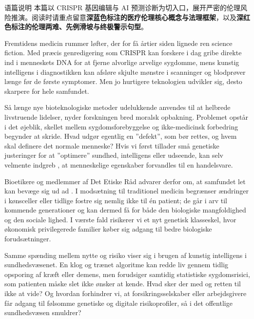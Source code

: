 \begin{tipbox}{语篇说明}
本篇以 CRISPR 基因编辑与 AI 预测诊断为切入口，展开严密的伦理风险推演。阅读时请重点留意\textbf{\color{NCDNavy}深蓝色标注的医疗伦理核心概念与法理框架}，以及\textbf{\color{NCDRed}深红色标注的伦理两难、先例滑坡与终极警示句型}。
\end{tipbox}

Fremtidens medicin rummer løfter, der for få årtier siden lignede ren science fiction. Med præcis genredigering som CRISPR kan forskere i dag gribe direkte ind i menneskets DNA for at fjerne alvorlige arvelige sygdomme, mens kunstig intelligens i diagnostikken kan afsløre skjulte mønstre i scanninger og blodprøver længe før de første symptomer. Men jo hurtigere teknologien udvikler sig, desto skarpere  for hele samfundet.

Så længe nye bioteknologiske metoder udelukkende anvendes  til at helbrede livstruende lidelser, nyder forskningen bred moralsk opbakning. Problemet opstår i det øjeblik, skellet mellem sygdomsforebyggelse og ikke-medicinsk forbedring begynder at skride. Hvad udgør egentlig en ”defekt”, som bør rettes, og hvem skal definere det normale menneske? Hvis vi først tillader små genetiske justeringer for at ”optimere” sundhed, intelligens eller udseende, kan selv velmente indgreb , at menneskelige egenskaber forvandles til en handelsvare.

Bioetikere og medlemmer af Det Etiske Råd advarer derfor om, at samfundet let kan bevæge sig ud ad . I modsætning til traditionel medicin begrænser ændringer i kønsceller eller tidlige fostre sig nemlig ikke til én patient; de går i arv til kommende generationer og kan dermed få  for både den biologiske mangfoldighed og den sociale lighed. I værste fald risikerer vi et nyt genetisk klasseskel, hvor økonomisk privilegerede familier køber sig adgang til bedre biologiske forudsætninger.

Samme spænding mellem nytte og risiko viser sig i brugen af kunstig intelligens i sundhedsvæsenet. En klog og trænet algoritme kan redde liv gennem tidlig opsporing af kræft eller demens, men forudsiger samtidig statistiske sygdomsrisici, som patienten måske slet ikke ønsker at kende. Hvad sker der med  og retten til ikke at vide? Og hvordan forhindrer vi, at forsikringsselskaber eller arbejdsgivere får adgang til følsomme genetiske og digitale risikoprofiler, så  i det offentlige sundhedsvæsen smuldrer?

